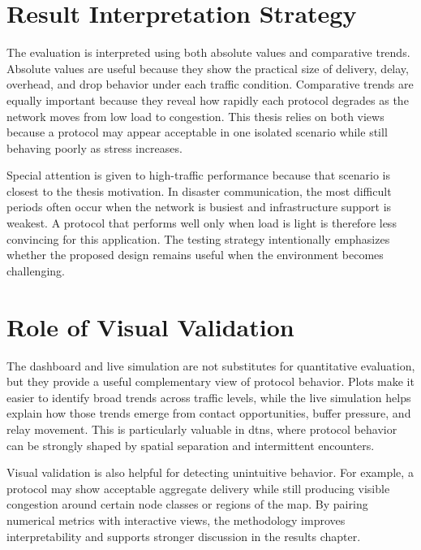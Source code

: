 \section{Result Interpretation Strategy}
The evaluation is interpreted using both absolute values and comparative trends. Absolute values are useful because they show the practical size of delivery, delay, overhead, and drop behavior under each traffic condition. Comparative trends are equally important because they reveal how rapidly each protocol degrades as the network moves from low load to congestion. This thesis relies on both views because a protocol may appear acceptable in one isolated scenario while still behaving poorly as stress increases.

Special attention is given to high-traffic performance because that scenario is closest to the thesis motivation. In disaster communication, the most difficult periods often occur when the network is busiest and infrastructure support is weakest. A protocol that performs well only when load is light is therefore less convincing for this application. The testing strategy intentionally emphasizes whether the proposed design remains useful when the environment becomes challenging.

\section{Role of Visual Validation}
The dashboard and live simulation are not substitutes for quantitative evaluation, but they provide a useful complementary view of protocol behavior. Plots make it easier to identify broad trends across traffic levels, while the live simulation helps explain how those trends emerge from contact opportunities, buffer pressure, and relay movement. This is particularly valuable in \acp{dtn}, where protocol behavior can be strongly shaped by spatial separation and intermittent encounters.

Visual validation is also helpful for detecting unintuitive behavior. For example, a protocol may show acceptable aggregate delivery while still producing visible congestion around certain node classes or regions of the map. By pairing numerical metrics with interactive views, the methodology improves interpretability and supports stronger discussion in the results chapter.
